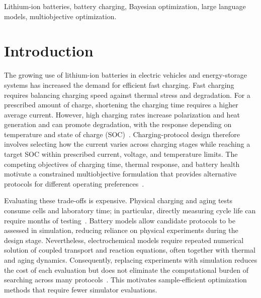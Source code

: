 \documentclass[journal]{IEEEtran}
\begin{document}
\begin{IEEEkeywords}
Lithium-ion batteries, battery charging, Bayesian optimization,
large language models, multiobjective optimization.
\end{IEEEkeywords}
\IEEEpeerreviewmaketitle



\section{Introduction}
\label{sec:introduction}

The growing use of lithium-ion batteries in electric vehicles and energy-storage
systems has increased the demand for efficient fast charging. Fast charging
requires balancing charging speed against thermal stress and degradation. For a
prescribed amount of charge, shortening the charging time requires a higher
average current. However, high charging rates increase polarization and heat
generation and can promote degradation, with the response depending on
temperature and state of charge (SOC)~\cite{refFastChargeReview,refTuXFC}.
Charging-protocol design therefore involves selecting how the current varies
across charging stages while reaching a target SOC within prescribed current,
voltage, and temperature limits. The competing objectives of charging time,
thermal response, and battery health motivate a constrained multiobjective
formulation that provides alternative protocols for different operating
preferences~\cite{nref2,refFanReview,refHuMulti}.

Evaluating these trade-offs is expensive. Physical charging and aging tests
consume cells and laboratory time; in particular, directly measuring cycle
life can require months of testing~\cite{nref3}. Battery models allow candidate
protocols to be assessed in simulation, reducing reliance on physical
experiments during the design stage. Nevertheless, electrochemical models
require repeated numerical solution of coupled transport and reaction
equations, often together with thermal and aging dynamics. Consequently,
replacing experiments with simulation reduces the cost of each evaluation but
does not eliminate the computational burden of searching across many
protocols~\cite{nref7,nref8}. This motivates sample-efficient optimization
methods that require fewer simulator evaluations.
\end{document}
